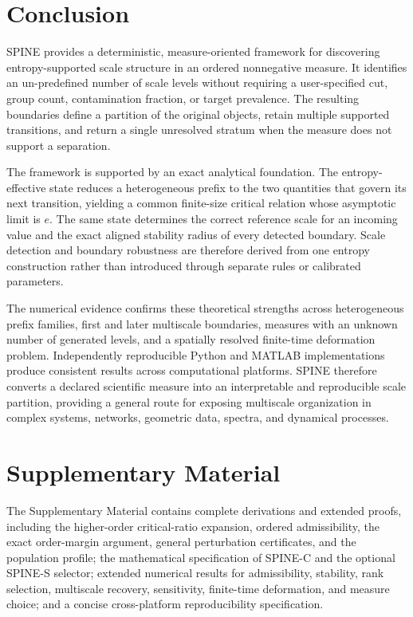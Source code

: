\documentclass[aip,cha,reprint,superscriptaddress,floatfix]{revtex4-2}
\theoremstyle{definition}
\theoremstyle{remark}
\begin{document}
\section{Conclusion}
\label{sec:conclusion}

SPINE provides a deterministic, measure-oriented framework for discovering entropy-supported scale structure in an ordered nonnegative measure. It identifies an un-predefined number of scale levels without requiring a user-specified cut, group count, contamination fraction, or target prevalence. The resulting boundaries define a partition of the original objects, retain multiple supported transitions, and return a single unresolved stratum when the measure does not support a separation.

The framework is supported by an exact analytical foundation. The entropy-effective state reduces a heterogeneous prefix to the two quantities that govern its next transition, yielding a common finite-size critical relation whose asymptotic limit is \(e\). The same state determines the correct reference scale for an incoming value and the exact aligned stability radius of every detected boundary. Scale detection and boundary robustness are therefore derived from one entropy construction rather than introduced through separate rules or calibrated parameters.

The numerical evidence confirms these theoretical strengths across heterogeneous prefix families, first and later multiscale boundaries, measures with an unknown number of generated levels, and a spatially resolved finite-time deformation problem. Independently reproducible Python and MATLAB implementations produce consistent results across computational platforms. SPINE therefore converts a declared scientific measure into an interpretable and reproducible scale partition, providing a general route for exposing multiscale organization in complex systems, networks, geometric data, spectra, and dynamical processes.

\section*{Supplementary Material}
The Supplementary Material contains complete derivations and extended proofs, including the higher-order critical-ratio expansion, ordered admissibility, the exact order-margin argument, general perturbation certificates, and the population profile; the mathematical specification of SPINE-C and the optional SPINE-S selector; extended numerical results for admissibility, stability, rank selection, multiscale recovery, sensitivity, finite-time deformation, and measure choice; and a concise cross-platform reproducibility specification.
\end{document}
